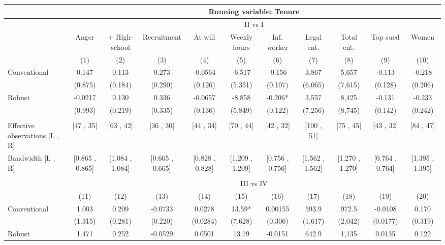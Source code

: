 \begin{tabular}{lcccccccccc}
\toprule
      & \multicolumn{10}{c}{Running variable: Tenure} \\
\midrule
      & \multicolumn{10}{c}{II vs I} \\
\midrule
\midrule
      & Anger & + High-school & Recruitment & At will  & Weekly hours & Inf. worker & Legal ent. & Total ent. & Top sued & Women \\
\midrule
      & (1)   & (2)   & (3)   & (4)   & (5)   & (6)   & (7)   & (8)   & (9)   & (10) \\
\midrule
\midrule
Conventional & 0.147 & 0.113 & 0.273 & -0.0564 & -6.517 & -0.156 & 3,867 & 5,657 & -0.113 & -0.218 \\
      & (0.875) & (0.184) & (0.290) & (0.126) & (5.351) & (0.107) & (6,065) & (7,615) & (0.128) & (0.206) \\
Robust & -0.0217 & 0.130 & 0.336 & -0.0657 & -8.858 & -0.206* & 3,557 & 8,425 & -0.131 & -0.233 \\
      & (0.993) & (0.219) & (0.335) & (0.136) & (5.849) & (0.122) & (7,256) & (8,745) & (0.142) & (0.242) \\
      &       &       &       &       &       &       &       &       &       &  \\
\midrule
Effective observations [L , R] & [47 , 35] & [63 , 42] & [36 , 30] & [44 , 34] & [70 , 44] & [42 , 32] & [100 , 51] & [75 , 45] & [43 , 32] & [84 , 47] \\
Bandwidth [L , R] & [0.865 , 0.865] & [1.084 , 1.084] & [0.665 , 0.665] & [0.828 , 0.828] & [1.209 , 1.209] & [0.756 , 0.756] & [1.562 , 1.562] & [1.270 , 1.270] & [0.764 , 0.764] & [1.395 , 1.395] \\
\midrule
\midrule
      &       &       &       &       &       &       &       &       &       &  \\
\midrule
      & \multicolumn{10}{c}{III vs IV} \\
\midrule
\midrule
      & (11)  & (12)  & (13)  & (14)  & (15)  & (16)  & (17)  & (18)  & (19)  & (20) \\
\midrule
\midrule
Conventional & 1.003 & 0.209 & -0.0733 & 0.0278 & 13.59* & 0.00155 & 593.9 & 972.5 & -0.0108 & 0.170 \\
      & (1.315) & (0.281) & (0.220) & (0.0284) & (7.628) & (0.306) & (1,617) & (2,042) & (0.0177) & (0.319) \\
Robust & 1.471 & 0.252 & -0.0529 & 0.0501 & 13.79 & -0.0151 & 642.9 & 1,135 & 0.0135 & 0.122 \\

\end{tabular}
